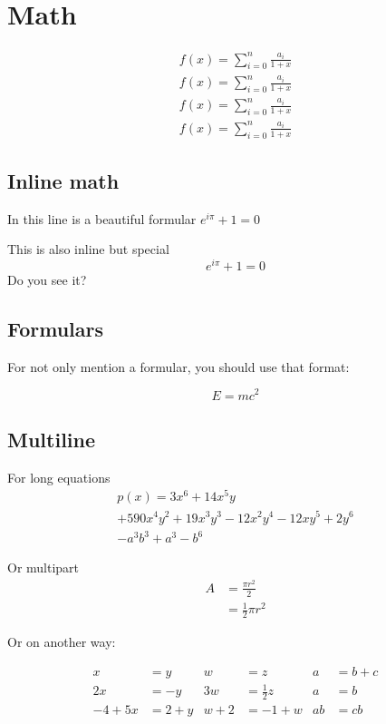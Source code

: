 \chapter{Math}

\begin{eqnarray*}
	f(x) = \sum_{i=0}^{n} \frac{a_i}{1+x} \\
	\textstyle f(x) = \textstyle \sum_{i=0}^{n} \frac{a_i}{1+x} \\
	\scriptstyle f(x) = \scriptstyle \sum_{i=0}^{n} \frac{a_i}{1+x} \\
	\scriptscriptstyle f(x) = \scriptscriptstyle \sum_{i=0}^{n} \frac{a_i}{1+x}
\end{eqnarray*}

\section{Inline math}
In this line is a beautiful formular $e^{i\pi} + 1 = 0$ \par
This is also inline but special \[e^{i\pi} + 1 = 0\] Do you see it?

\section{Formulars}
For not only mention a formular, you should use that format:

\begin{equation}
E=mc^2
\end{equation}

\section{Multiline}

For long equations
\begin{multline}
p(x) = 3x^6 + 14x^5y \\+ 590x^4y^2 + 19x^3y^3
- 12x^2y^4 - 12xy^5 + 2y^6 \\- a^3b^3 + a^3 - b^6
\end{multline}


Or multipart
\begin{equation}
\begin{split}
A & = \frac{\pi r^2}{2} \\
& = \frac{1}{2} \pi r^2
\end{split}
\end{equation}

Or on another way:


\begin{align}
x&=y           &  w &=z              &  a&=b+c\\
2x&=-y         &  3w&=\frac{1}{2}z   &  a&=b\\
-4 + 5x&=2+y   &  w+2&=-1+w          &  ab&=cb
\end{align}

